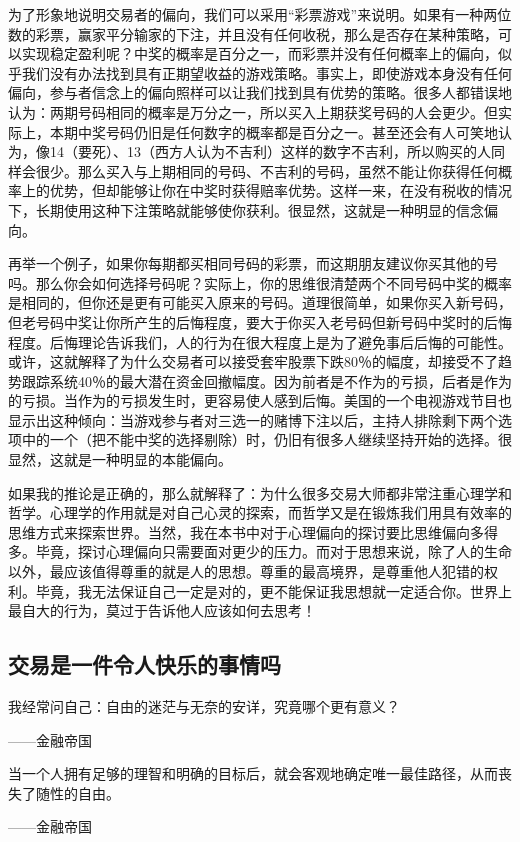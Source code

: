 为了形象地说明交易者的偏向，我们可以采用“彩票游戏”来说明。如果有一种两位数的彩票，赢家平分输家的下注，并且没有任何收税，那么是否存在某种策略，可以实现稳定盈利呢？中奖的概率是百分之一，而彩票并没有任何概率上的偏向，似乎我们没有办法找到具有正期望收益的游戏策略。事实上，即使游戏本身没有任何偏向，参与者信念上的偏向照样可以让我们找到具有优势的策略。很多人都错误地认为：两期号码相同的概率是万分之一，所以买入上期获奖号码的人会更少。但实际上，本期中奖号码仍旧是任何数字的概率都是百分之一。甚至还会有人可笑地认为，像14（要死）、13（西方人认为不吉利）这样的数字不吉利，所以购买的人同样会很少。那么买入与上期相同的号码、不吉利的号码，虽然不能让你获得任何概率上的优势，但却能够让你在中奖时获得赔率优势。这样一来，在没有税收的情况下，长期使用这种下注策略就能够使你获利。很显然，这就是一种明显的信念偏向。

再举一个例子，如果你每期都买相同号码的彩票，而这期朋友建议你买其他的号吗。那么你会如何选择号码呢？实际上，你的思维很清楚两个不同号码中奖的概率是相同的，但你还是更有可能买入原来的号码。道理很简单，如果你买入新号码，但老号码中奖让你所产生的后悔程度，要大于你买入老号码但新号码中奖时的后悔程度。后悔理论告诉我们，人的行为在很大程度上是为了避免事后后悔的可能性。或许，这就解释了为什么交易者可以接受套牢股票下跌80％的幅度，却接受不了趋势跟踪系统40％的最大潜在资金回撤幅度。因为前者是不作为的亏损，后者是作为的亏损。当作为的亏损发生时，更容易使人感到后悔。美国的一个电视游戏节目也显示出这种倾向：当游戏参与者对三选一的赌博下注以后，主持人排除剩下两个选项中的一个（把不能中奖的选择剔除）时，仍旧有很多人继续坚持开始的选择。很显然，这就是一种明显的本能偏向。

如果我的推论是正确的，那么就解释了：为什么很多交易大师都非常注重心理学和哲学。心理学的作用就是对自己心灵的探索，而哲学又是在锻炼我们用具有效率的思维方式来探索世界。当然，我在本书中对于心理偏向的探讨要比思维偏向多得多。毕竟，探讨心理偏向只需要面对更少的压力。而对于思想来说，除了人的生命以外，最应该值得尊重的就是人的思想。尊重的最高境界，是尊重他人犯错的权利。毕竟，我无法保证自己一定是对的，更不能保证我思想就一定适合你。世界上最自大的行为，莫过于告诉他人应该如何去思考！

\subsection{交易是一件令人快乐的事情吗}

{\kaishu
我经常问自己：自由的迷茫与无奈的安详，究竟哪个更有意义？

\hfill ——金融帝国

当一个人拥有足够的理智和明确的目标后，就会客观地确定唯一最佳路径，从而丧失了随性的自由。

\hfill ——金融帝国
}

